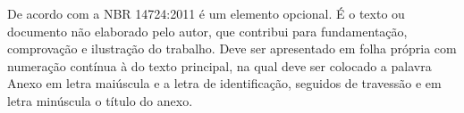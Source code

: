 De acordo com a NBR 14724:2011 é um elemento opcional. É o texto ou documento não
elaborado pelo autor, que contribui para fundamentação, comprovação e ilustração do trabalho.
Deve ser apresentado em folha própria com numeração contínua à do texto principal, na qual
deve ser colocado a palavra Anexo em letra maiúscula e a letra de identificação, seguidos de
travessão e em letra minúscula o título do anexo.